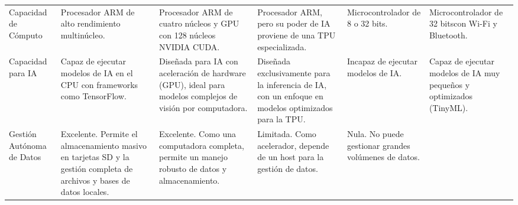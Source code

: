 {\begin{longtable}[c]{p{2.2cm} p{2.4cm} p{2.4cm} p{2.4cm} p{2.4cm} p{2.4cm}}
    Capacidad de Cómputo                                                                                                                                   &
    Procesador ARM de alto rendimiento multinúcleo.                                                                                                        &
    Procesador ARM de cuatro núcleos y GPU con 128 núcleos NVIDIA CUDA.                                                                                    &
    Procesador ARM, pero su poder de IA proviene de una TPU especializada.                                                                                 &
    Microcontrolador de 8 o 32 bits.                                                                                                                       &
    Microcontrolador de 32 bitscon Wi-Fi y Bluetooth.                                                                                                        \\
    \addlinespace
    Capacidad para IA                                                                                                                                      &
    Capaz de ejecutar modelos de IA en el CPU con frameworks como TensorFlow.                                                                              &
    Diseñada para IA con aceleración de hardware (GPU), ideal para modelos complejos de visión por computadora.                                            &
    Diseñada exclusivamente para la inferencia de IA, con un enfoque en modelos optimizados para la TPU.                                                   &
    Incapaz de ejecutar modelos de IA.                                                                                                                     &
    Capaz de ejecutar modelos de IA muy pequeños y optimizados (TinyML).
    \\
    \addlinespace
    Gestión Autónoma de Datos                                                                                                                              &
    Excelente. Permite el almacenamiento masivo en tarjetas SD y la gestión completa de archivos y bases de datos locales.                                 &
    Excelente. Como una computadora completa, permite un manejo robusto de datos y almacenamiento.                                                         &
    Limitada. Como acelerador, depende de un host para la gestión de datos.                                                                                &
    Nula. No puede gestionar grandes volúmenes de datos.                                                                                                   &

\end{longtable}}
